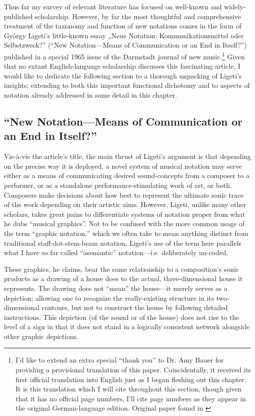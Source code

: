     Thus far my survey of relevant literature has focused on well-known and widely-published scholarship. However, by far the most thoughtful and comprehensive treatment of the taxonomy and function of new notations comes in the form of György Ligeti's little-known essay „Neue Notation: Kommunikationsmittel oder Selbstzweck?” (``New Notation---Means of Communication or an End in Itself?'') published in a special 1965 issue of the Darmstadt journal of new music.\footnote{I'd like to extend an extra special ``thank you'' to Dr. Amy Bauer for providing a provisional translation of this paper. Coincidentally, it received its first official translation into English just as I began fleshing out this chapter. It is this translation which I will cite throughout this section, though given that it has no official page numbers, I'll cite page numbers as they appear in the original German-language edition. Original paper found in \autocite{Ligeti_1965}} Given that no extant English-language scholarship discusses this fascinating article, I would like to dedicate the following section to a thorough unpacking of Ligeti's insights; extending to both this important functional dichotomy and to aspects of notation already addressed in some detail in this chapter.

    \subsection{``New Notation---Means of Communication or an End in Itself?''}

    Vis-à-vis the article's title, the main thrust of Ligeti's argument is that depending on the precise way it is deployed, a novel system of musical notation may serve either as a means of communicating desired sound-concepts from a composer to a performer, or as a standalone performance-stimulating work of art, or both. Composers make decisions about how best to represent the ultimate sonic trace of the work depending on their artistic aims. However, Ligeti, unlike many other scholars, takes great pains to differentiate systems of notation proper from what he dubs ``musical graphics''. Not to be confused with the more common usage of the term ``graphic notation,'' which we often take to mean anything distinct from traditional staff-dot-stem-beam notation, Ligeti's use of the term here parallels what I have so far called ``asemantic'' notation---i.e. deliberately un-coded.
    
    These graphics, he claims, bear the same relationship to a composition's sonic products as a drawing of a house does to the actual, three-dimensional house it represents. The drawing does not ``mean'' the house---it merely serves as a depiction; allowing one to recognize the really-existing structure in its two-dimensional contours, but not to construct the house by following detailed instructions.  This depiction (of the sound or of the house) does not rise to the level of a sign in that it does not stand in a logically consistent network alongside other graphic depictions. 

